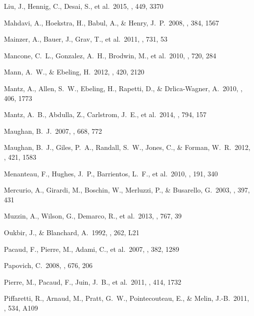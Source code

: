 \documentclass[apj,twocolumn]{emulateapj}
\begin{document}
{\begin{thebibliography}{88}
 Liu, J., Hennig, C., Desai, S., et al.\ 2015, \mnras, 449, 3370 

 Mahdavi, A., Hoekstra, H., Babul, A., \& Henry, J.~P.\ 2008, \mnras, 384, 1567 

 Mainzer, A., Bauer, J., Grav, T., et al.\ 2011, \apj, 731, 53 

 Mancone, C.~L., Gonzalez, A.~H., Brodwin, M., et al.\ 2010, \apj, 720, 284 

 Mann, A.~W., \& Ebeling, H.\ 2012, \mnras, 420, 2120 

 Mantz, A., Allen, S.~W., Ebeling, H., Rapetti, D., \& Drlica-Wagner, A.\ 2010, \mnras, 406, 1773 

 Mantz, A.~B., Abdulla, Z., Carlstrom, J.~E., et al.\ 2014, \apj, 794, 157 

 Maughan, B.~J.\ 2007, \apj, 668, 772 

 Maughan, B.~J., Giles, P.~A., Randall, S.~W., Jones, C., \& Forman, W.~R.\ 2012, \mnras, 421, 1583 

 Menanteau, F., Hughes, J.~P., Barrientos, L.~F., et al.\ 2010, \apjs, 191, 340 

 Mercurio, A., Girardi, M., Boschin, W., Merluzzi, P., \& Busarello, G.\ 2003, \aap, 397, 431 

 Muzzin, A., Wilson, G., Demarco, R., et al.\ 2013, \apj, 767, 39 

 Oukbir, J., \& Blanchard, A.\ 1992, \aap, 262, L21 

 Pacaud, F., Pierre, M., Adami, C., et al.\ 2007, \mnras, 382, 1289 

 Papovich, C.\ 2008, \apj, 676, 206 

 Pierre, M., Pacaud, F., Juin, J.~B., et al.\ 2011, \mnras, 414, 1732 

 Piffaretti, R., Arnaud, M., Pratt, G.~W., Pointecouteau, E., \& Melin, J.-B.\ 2011, \aap, 534, A109 


\end{thebibliography}}
\end{document}
